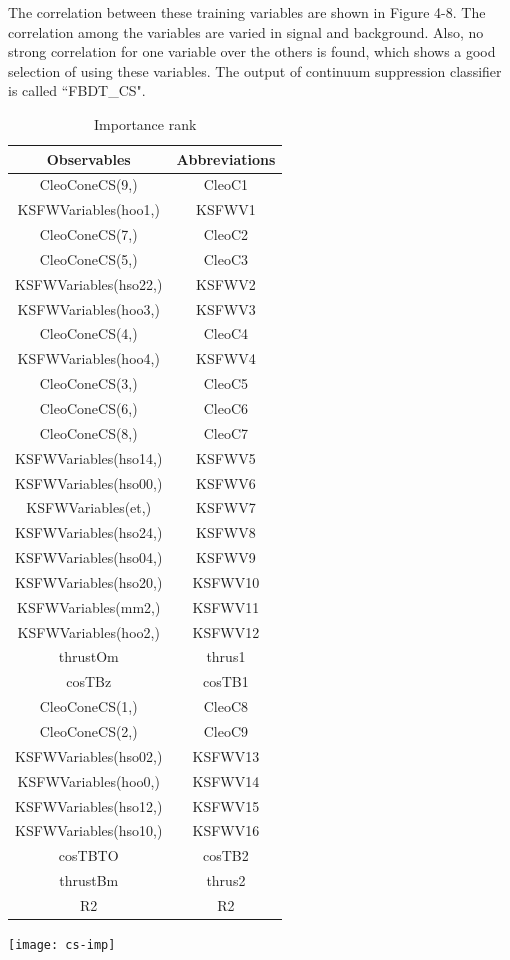 The correlation between these training variables are shown in Figure 4-8. The correlation among the variables are varied in signal and background. Also, no strong correlation for one variable over the others is found, which shows a good selection of using these variables. The output of continuum suppression classifier is called ``FBDT\_CS".
\begin{table}[htpb]
	\begin{minipage}[t]{0.4\linewidth}
		\centering
		\caption{The Abbreviations.}
		\begin{tabular}{c|c}
			\hline
			Observables &  Abbreviations\\
			\hline
			CleoConeCS(9,) &  CleoC1 \\
			KSFWVariables(hoo1,) & KSFWV1 \\
			CleoConeCS(7,) & CleoC2\\
			CleoConeCS(5,) & CleoC3\\
			KSFWVariables(hso22,) & KSFWV2\\
			KSFWVariables(hoo3,) & KSFWV3\\
			CleoConeCS(4,) & CleoC4 \\
			KSFWVariables(hoo4,) &  KSFWV4\\
			CleoConeCS(3,) & CleoC5 \\
			CleoConeCS(6,) & CleoC6\\
			CleoConeCS(8,) & CleoC7\\
			KSFWVariables(hso14,) &   KSFWV5\\
			KSFWVariables(hso00,) & KSFWV6\\
			KSFWVariables(et,) & KSFWV7\\
			KSFWVariables(hso24,) & KSFWV8\\
			KSFWVariables(hso04,) & KSFWV9\\
			KSFWVariables(hso20,) & KSFWV10 \\
			KSFWVariables(mm2,)  & KSFWV11\\
			KSFWVariables(hoo2,) &  KSFWV12\\
			thrustOm & thrus1 \\
			cosTBz & cosTB1\\
			CleoConeCS(1,) & CleoC8 \\
			CleoConeCS(2,) & CleoC9 \\
			KSFWVariables(hso02,) &  KSFWV13\\
			KSFWVariables(hoo0,) &  KSFWV14 \\
			KSFWVariables(hso12,) &  KSFWV15\\
			KSFWVariables(hso10,) & KSFWV16\\
			cosTBTO & cosTB2\\
			thrustBm & thrus2\\
			R2 & R2\\
			\hline
		\end{tabular}
	\end{minipage}
	\begin{minipage}[t]{0.5\linewidth}
		\centering 
		\caption{Importance rank }
		\texttt{[image: cs-imp]}
	\end{minipage}
\end{table}
